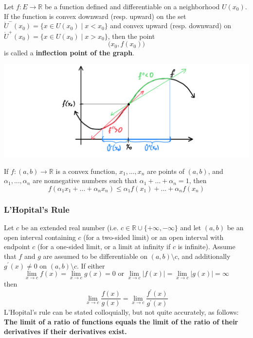     \begin{definition}
      Let $f: E \longrightarrow \mathbb{R}$ be a function defined and differentiable on a neighborhood $U(x_0)$. If the function is convex downward (resp. upward) on the set $\mathring{U}^- (x_0) = \{x \in U(x_0) \;|\; x < x_0\}$ and convex upward (resp. downward) on $\mathring{U}^+ (x_0) = \{x \in U(x_0)\;|\; x > x_0\}$, then the point 
      \[\big( x_0, f(x_0) \big)\]
      is called a \textbf{inflection point of the graph}. 
      \begin{center}
          \includegraphics[scale=0.25]{img/Inflection_Point_Analysis.PNG}
      \end{center}
    \end{definition}

    \begin{proposition}
    If $f: (a, b) \longrightarrow \mathbb{R}$ is a convex function, $x_1, ..., x_n$ are points of $(a, b)$, and $\alpha_1, ..., \alpha_n$ are nonnegative numbers such that $\alpha_1 + ... + \alpha_n = 1$, then 
    \[f(\alpha_1 x_1 + ... + \alpha_n x_n) \leq \alpha_1 f(x_1) + ... + \alpha_n f(x_n)\]
    \end{proposition}

    \subsubsection{L'Hopital's Rule}

    \begin{theorem}
    Let $c$ be an extended real number (i.e. $c \in \mathbb{R} \cup \{+\infty, -\infty\}$ and let $(a, b)$ be an open interval containing $c$ (for a two-sided limit) or an open interval with endpoint $c$ (for a one-sided limit, or a limit at infinity if $c$ is infinite). Assume that $f$ and $g$ are assumed to be differentiable on $(a, b) \setminus c$, and additionally $g^\prime (x) \neq 0$ on $(a, b) \setminus c$. If either 
    \[\lim_{x \rightarrow c} f(x) = \lim_{x \rightarrow c} g(x) = 0 \text{ or } \lim_{x \rightarrow c} |f(x)| = \lim_{x \rightarrow c} |g(x)| = \infty\]
    then 
    \[\lim_{x \rightarrow c} \frac{f(x)}{g(x)} = \lim_{x \rightarrow c} \frac{f^\prime (x)}{g^\prime (x)}\]
    L'Hopital's rule can be stated colloquially, but not quite accurately, as follows: \textbf{The limit of a ratio of functions equals the limit of the ratio of their derivatives if their derivatives exist.}
    \end{theorem}

